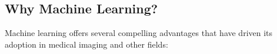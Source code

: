 

\subsection{Why Machine Learning?}
\label{sec:why_ml}
Machine learning offers several compelling advantages that have driven its adoption in medical imaging and other fields:

